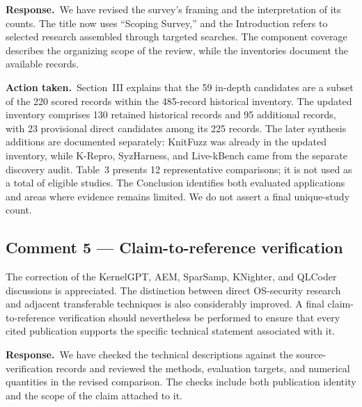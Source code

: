 \documentclass[11pt,a4paper]{article}
\newcommand{\response}{\par\textbf{Response.}\ }
\newcommand{\action}{\par\textbf{Action taken.}\ }
\begin{document}
\response We have revised the survey's framing and the interpretation of its counts. The title now uses ``Scoping Survey,'' and the Introduction refers to selected research assembled through targeted searches. The component coverage describes the organizing scope of the review, while the inventories document the available records.

\action Section~III explains that the 59 in-depth candidates are a subset of the 220 scored records within the 485-record historical inventory. The updated inventory comprises 130 retained historical records and 95 additional records, with 23 provisional direct candidates among its 225 records. The later synthesis additions are documented separately: KnitFuzz was already in the updated inventory, while K-Repro, SyzHarness, and Live-kBench came from the separate discovery audit. Table~3 presents 12 representative comparisons; it is not used as a total of eligible studies. The Conclusion identifies both evaluated applications and areas where evidence remains limited. We do not assert a final unique-study count.

\subsection{Comment 5 --- Claim-to-reference verification}
\begin{reviewcomment}
The correction of the KernelGPT, AEM, SparSamp, KNighter, and QLCoder discussions is appreciated. The distinction between direct OS-security research and adjacent transferable techniques is also considerably improved. A final claim-to-reference verification should nevertheless be performed to ensure that every cited publication supports the specific technical statement associated with it.
\end{reviewcomment}

\response We have checked the technical descriptions against the source-verification records and reviewed the methods, evaluation targets, and numerical quantities in the revised comparison. The checks include both publication identity and the scope of the claim attached to it.
\end{document}
